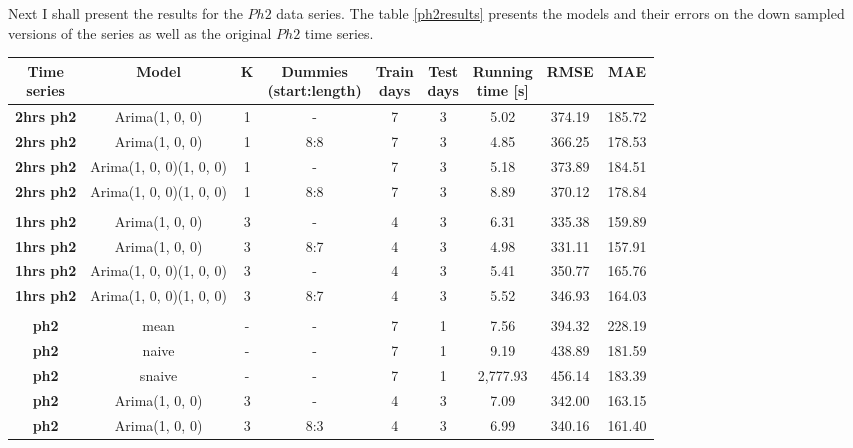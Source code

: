 \documentclass[12pt,a4paper,titlepage]{report}
\begin{document}
Next I shall present the results for the $ Ph2 $ data series. The table \ref{ph2results} presents the models and their errors on the down sampled versions of the series as well as the original $ Ph2 $ time series.

\begin{table}[htbp]
    \begin{tabular}{|c|c|c|c|c|c|c|c|c|}
        \hline
        \makecell{\textbf{Time} \\ \textbf{series}} & \textbf{Model}          & \textbf{K} & \makecell{\textbf{Dummies} \\ \textbf{(start:length)}} & \makecell{\textbf{Train} \\ \textbf{days}} & \makecell{\textbf{Test}\\ \textbf{days}} & \makecell{\textbf{Running} \\ \textbf{time {[}s{]}}} & \textbf{RMSE} & \textbf{MAE} \\ \hline
        \textbf{2hrs ph2} & Arima(1, 0, 0)          & 1 & -   & 7 & 3 & 5.02     & 374.19 & 185.72 \\ \hline
        \textbf{2hrs ph2} & Arima(1, 0, 0)          & 1 & 8:8 & 7 & 3 & 4.85     & 366.25 & 178.53 \\ \hline
        \textbf{2hrs ph2} & Arima(1, 0, 0)(1, 0, 0) & 1 & -   & 7 & 3 & 5.18     & 373.89 & 184.51 \\ \hline
        \textbf{2hrs ph2} & Arima(1, 0, 0)(1, 0, 0) & 1 & 8:8 & 7 & 3 & 8.89     & 370.12 & 178.84 \\ \hline
        \textbf{}         &                         &   &     &   &   &          &        &        \\ \hline
        \textbf{1hrs ph2} & Arima(1, 0, 0)          & 3 & -   & 4 & 3 & 6.31     & 335.38 & 159.89 \\ \hline
        \textbf{1hrs ph2} & Arima(1, 0, 0)          & 3 & 8:7 & 4 & 3 & 4.98     & 331.11 & 157.91 \\ \hline
        \textbf{1hrs ph2} & Arima(1, 0, 0)(1, 0, 0) & 3 & -   & 4 & 3 & 5.41     & 350.77 & 165.76 \\ \hline
        \textbf{1hrs ph2} & Arima(1, 0, 0)(1, 0, 0) & 3 & 8:7 & 4 & 3 & 5.52     & 346.93 & 164.03 \\ \hline
        \textbf{}         &                         &   &     &   &   &          &        &        \\ \hline
        \textbf{ph2}      & mean                    & - & -   & 7 & 1 & 7.56     & 394.32 & 228.19 \\ \hline
        \textbf{ph2}      & naive                   & - & -   & 7 & 1 & 9.19     & 438.89 & 181.59 \\ \hline
        \textbf{ph2}      & snaive                  & - & -   & 7 & 1 & 2,777.93 & 456.14 & 183.39 \\ \hline
        \textbf{ph2}      & Arima(1, 0, 0)          & 3 & -   & 4 & 3 & 7.09     & 342.00 & 163.15 \\ \hline
        \textbf{ph2}      & Arima(1, 0, 0)          & 3 & 8:3 & 4 & 3 & 6.99     & 340.16 & 161.40 \\ \hline
    \end{tabular}
    

\end{table}
\end{document}
